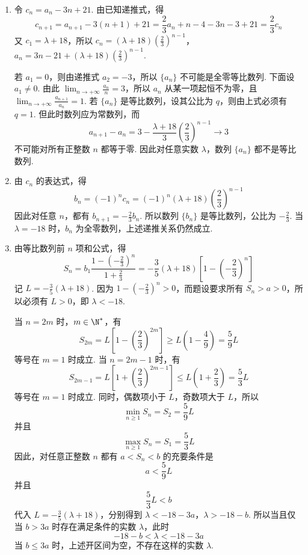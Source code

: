 \begin{solution}
\begin{enumerate}
\item 令 \(c_{n}=a_{n}-3n+21\). 由已知递推式，得
\[
c_{n+1}=a_{n+1}-3(n+1)+21=\frac23a_n+n-4-3n-3+21=\frac23c_n
\]
又 \(c_1=\lambda+18\)，所以
\(c_n=(\lambda+18)\left(\frac23\right)^{n-1}\)，\(a_n=3n-21+(\lambda+18)\left(\frac23\right)^{n-1}\).

若 \(a_1=0\)，则由递推式 \(a_2=-3\)，所以 \(\{a_n\}\) 不可能是全零等比数列. 下面设 \(a_1\neq0\). 由此 \(\displaystyle\lim_{n\to+\infty}\frac{a_n}{n}=3\)，所以 \(a_n\) 从某一项起恒不为零，且 \(\displaystyle\lim_{n\to+\infty}\frac{a_{n+1}}{a_n}=1\). 若 \(\{a_n\}\) 是等比数列，设其公比为 \(q\)，则由上式必须有 \(q=1\). 但此时数列应为常数列，而
\[
a_{n+1}-a_n=3-\frac{\lambda+18}{3}\left(\frac23\right)^{n-1}\longrightarrow3
\]
不可能对所有正整数 \(n\) 都等于零. 因此对任意实数 \(\lambda\)，数列 \(\{a_n\}\) 都不是等比数列.

\item 由 \(c_n\) 的表达式，得
\[
b_n=(-1)^n c_n=(-1)^n(\lambda+18)\left(\frac23\right)^{n-1}
\]
因此对任意 \(n\)，都有 \(b_{n+1}=-\frac23b_n\). 所以数列 \(\{b_n\}\) 是等比数列，公比为 \(-\frac23\). 当 \(\lambda=-18\) 时，\(b_n\) 为全零数列，上述递推关系仍然成立.

\item 由等比数列前 \(n\) 项和公式，得
\[
S_n=b_1\frac{1-\left(-\frac23\right)^n}{1+\frac23}=-\frac35(\lambda+18)\left[1-\left(-\frac23\right)^n\right]
\]
记 \(L=-\frac35(\lambda+18)\). 因为 \(1-\left(-\frac23\right)^n>0\)，而题设要求所有 \(S_n>a>0\)，所以必须有 \(L>0\)，即 \(\lambda<-18\).

当 \(n=2m\) 时，\(m\in\N^*\)，有
\[
S_{2m}=L\left[1-\left(\frac23\right)^{2m}\right]\geqslant L\left(1-\frac49\right)=\frac59L
\]
等号在 \(m=1\) 时成立. 当 \(n=2m-1\) 时，有
\[
S_{2m-1}=L\left[1+\left(\frac23\right)^{2m-1}\right]\leqslant L\left(1+\frac23\right)=\frac53L
\]
等号在 \(m=1\) 时成立. 同时，偶数项小于 \(L\)，奇数项大于 \(L\)，所以
\[
\min_{n\geqslant1}S_n=S_2=\frac59L
\]
并且
\[
\max_{n\geqslant1}S_n=S_1=\frac53L
\]
因此，对任意正整数 \(n\) 都有 \(a<S_n<b\) 的充要条件是
\[
a<\frac59L
\]
并且
\[
\frac53L<b
\]
代入 \(L=-\frac35(\lambda+18)\)，分别得到
\(\lambda<-18-3a\)，\(\lambda>-18-b\).
所以当且仅当 \(b>3a\) 时存在满足条件的实数 \(\lambda\)，此时
\[
-18-b<\lambda<-18-3a
\]
当 \(b\leqslant3a\) 时，上述开区间为空，不存在这样的实数 \(\lambda\).
\end{enumerate}
\end{solution}
